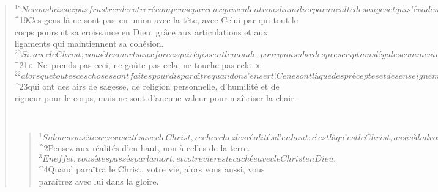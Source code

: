 \begin{verse}
${}^{18}Ne vous laissez pas frustrer de votre récompense par ceux qui veulent vous humilier par un culte des anges et qui s’évadent dans des visions et se laissent vainement gonfler d’orgueil par des idées purement humaines. 
${}^{19}Ces gens-là ne sont pas en union avec la tête, avec Celui par qui tout le corps poursuit sa croissance en Dieu, grâce aux articulations et aux ligaments qui maintiennent sa cohésion.
${}^{20}Si, avec le Christ, vous êtes morts aux forces qui régissent le monde, pourquoi subir des prescriptions légales comme si votre vie dépendait encore du monde : 
${}^{21}« Ne prends pas ceci, ne goûte pas cela, ne touche pas cela », 
${}^{22}alors que toutes ces choses sont faites pour disparaître quand on s’en sert ! Ce ne sont là que des préceptes et des enseignements humains, 
${}^{23}qui ont des airs de sagesse, de religion personnelle, d’humilité et de rigueur pour le corps, mais ne sont d’aucune valeur pour maîtriser la chair.
      
         
      \bchapter{}
      \begin{verse}
${}^{1}Si donc vous êtes ressuscités avec le Christ, recherchez les réalités d’en haut : c’est là qu’est le Christ, assis à la droite de Dieu. 
${}^{2}Pensez aux réalités d’en haut, non à celles de la terre. 
${}^{3}En effet, vous êtes passés par la mort, et votre vie reste cachée avec le Christ en Dieu. 
${}^{4}Quand paraîtra le Christ, votre vie, alors vous aussi, vous paraîtrez avec lui dans la gloire.
      

\end{verse}
\end{verse}
